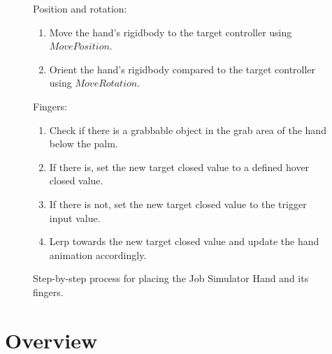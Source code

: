 \begin{figure}[H]
\centering
\small
Position and rotation:
\begin{enumerate}[noitemsep]
\item Move the hand's rigidbody to the target controller using $MovePosition$.
\item Orient the hand's rigidbody compared to the target controller using $MoveRotation$.
\end{enumerate}
Fingers:
\begin{enumerate}[noitemsep]
\item Check if there is a grabbable object in the grab area of the hand below the palm.
\item If there is, set the new target closed value to a defined hover closed value.
\item If there is not, set the new target closed value to the trigger input value.
\item Lerp towards the new target closed value and update the hand animation accordingly.
\end{enumerate}
\caption{Step-by-step process for placing the Job Simulator Hand and its fingers.}
\label{fig:stepByStepJobSimHand}
\end{figure}

\section{Overview}
\label{sec:experimentalAnalysisOverview}


